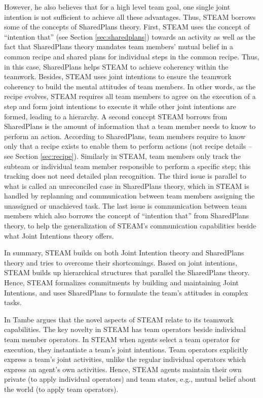 \documentclass[12pt]{report}
\begin{document}
However, he also believes that for a high level team goal, one single joint
intention is not sufficient to achieve all these advantages. Thus, STEAM borrows
some of the concepts of SharedPlans theory. First, STEAM uses the concept of
``intention that'' (see Section \ref{sec:sharedplans}) towards an activity as
well as the fact that SharedPlans theory mandates team members' mutual belief in
a common recipe and shared plans for individual steps in the common recipe.
Thus, in this case, SharedPlans helps STEAM to achieve coherency within the
teamwork. Besides, STEAM uses joint intentions to ensure the teamwork coherency
to build the mental attitudes of team members. In other words, as the recipe
evolves, STEAM requires all team members to agree on the execution of a step and
form joint intentions to execute it while other joint intentions are formed,
leading to a hierarchy. A second concept STEAM borrows from SharedPlans is the
amount of information that a team member needs to know to perform an action.
According to SharedPlans, team members require to know only that a recipe exists
to enable them to perform actions (not recipe details -- see Section
\ref{sec:recipe}). Similarly in STEAM, team members only track the subteam or
individual team member responsible to perform a specific step; this tracking
does not need detailed plan recognition. The third issue is parallel to what is
called an unreconciled case in SharedPlans theory, which in STEAM is handled by
replanning and communication between team members assigning the unassigned or
unachieved task. The last issue is communication between team members which also
borrows the concept of ``intention that'' from SharedPlans theory, to help the
generalization of STEAM's communication capabilities beside what Joint
Intentions theory offers.

In summary, STEAM builds on both Joint Intention theory and SharedPlans theory
and tries to overcome their shortcomings. Based on joint intentions, STEAM
builds up hierarchical structures that parallel the SharedPlans theory. Hence,
STEAM formalizes commitments by building and maintaining Joint Intentions, and
uses SharedPlans to formulate the team's attitudes in complex tasks.

In \cite{tambe:flexible-teamwork} Tambe argues that the novel aspects of STEAM
relate to its teamwork capabilities. The key novelty in STEAM has team operators
beside individual team member operators. In STEAM when agents select a team
operator for execution, they instantiate a team's joint intentions. Team
operators explicitly express a team's joint activities, unlike the regular
individual operators which express an agent's own activities. Hence, STEAM
agents maintain their own private (to apply individual operators) and team
states, e.g., mutual belief about the world (to apply team operators).
\end{document}
